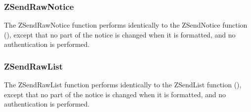 \subsubsection{ZSendRawNotice}
\label{ZSendRawNotice}

\etemplate
{}

The ZSendRawNotice function performs identically to the ZSendNotice
function (), except that no part of the notice is
changed when it is formatted, and no authentication is performed.

\subsubsection{ZSendRawList}
\label{ZSendRawList}

\etemplate
{}

The ZSendRawList function performs identically to the ZSendList
function (), except that no part of the notice is
changed when it is formatted, and no authentication is performed.




